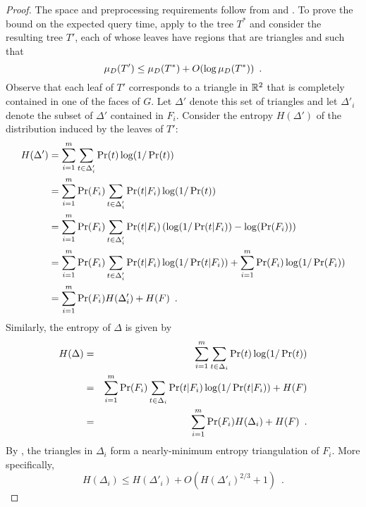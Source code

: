 \documentclass[lotsofwhite]{patmorin}
\begin{document}
\begin{proof}
The space and preprocessing requirements follow from
 and .
To prove the bound on the expected query time, apply
 to the tree $T^*$ and consider the resulting tree
$T'$, each of whose leaves have regions that are triangles and such
that
\begin{equation}
     \mu_D(T') \le \mu_D(T^*) + O(\log \mu_D(T^*)) \enspace .
       \eqlabelx{t-triangle}
\end{equation}
Observe that each leaf of $T'$ corresponds to a triangle in $\mathbb{R}^2$
that is completely contained in one of the faces of $G$.  Let
$\Delta'$ denote this set of triangles and let $\Delta'_i$ denote the
subset of $\Delta'$ contained in $F_i$.
Consider the entropy $H(\Delta')$ of the distribution induced by the
leaves of $T'$:
\begin{equation}\eqlabelx{h-delta-prime}
 \begin{split}
   H(\Delta') 
     & =  \sum_{i=1}^m \sum_{t\in \Delta'_i}\Pr(t)\log(1/\Pr(t)) \\
     & =  \sum_{i=1}^m \Pr(F_i)\sum_{t\in \Delta'_i}
            \Pr(t|F_i)\log(1/\Pr(t)) \\
     & =  \sum_{i=1}^m \Pr(F_i)\sum_{t\in \Delta'_i}
            \Pr(t|F_i)
            \left(
              \log(1/\Pr(t|F_i))-\log(\Pr(F_i))
            \right) \\
     & =  \sum_{i=1}^m \Pr(F_i)\sum_{t\in \Delta'_i}
            \Pr(t|F_i)\log(1/\Pr(t|F_i)) 
             + \sum_{i=1}^m \Pr(F_i) \log(1/\Pr(F_i)) \\
     & =  \sum_{i=1}^m \Pr(F_i) H(\Delta'_i) + H(F) \enspace .
 \end{split}
\end{equation}
Similarly, the entropy of $\Delta$ is given by 
\begin{eqnarray*}
   H(\Delta) 
     & = & \sum_{i=1}^m \sum_{t\in \Delta_i}\Pr(t)\log(1/\Pr(t)) \\
     & = & \sum_{i=1}^m \Pr(F_i)\sum_{t\in \Delta_i}
            \Pr(t|F_i)\log(1/\Pr(t|F_i)) 
          + H(F) \\
     & = & \sum_{i=1}^m \Pr(F_i) H(\Delta_i) + H(F) \enspace .
      \eqlabelx{h-delta}
\end{eqnarray*}
By , the triangles in $\Delta_i$ form a
nearly-minimum entropy triangulation of $F_i$.  More specifically, 
\begin{equation}
   H(\Delta_i) \le H(\Delta'_i) + O(H(\Delta'_i)^{2/3}+1)  \enspace .

\end{equation}
\end{proof}
\end{document}

